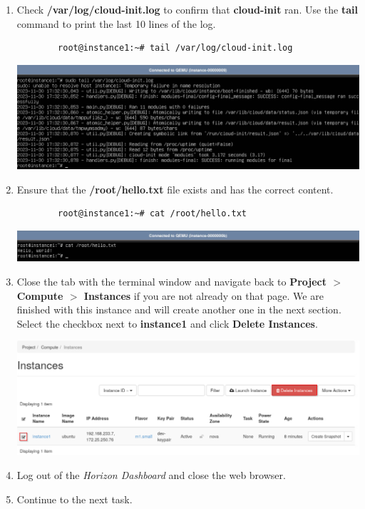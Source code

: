 \documentclass[letterpaper, 12pt]{article}
\begin{document}
\begin{enumerate}
    \item Check \textbf{/var/log/cloud-init.log} to confirm that \textbf{cloud-init} ran. Use the \textbf{tail}
    command to print the last 10 lines of the log.
    \begin{lstlisting}
        root@instance1:~# tail /var/log/cloud-init.log
    \end{lstlisting}

    \begin{center}
        \includegraphics[width=\linewidth]{images/part2/step14.png}
    \end{center}

    \item Ensure that the \textbf{/root/hello.txt} file exists and has the correct content.
    \begin{lstlisting}
        root@instance1:~# cat /root/hello.txt
    \end{lstlisting}

    \begin{center}
        \includegraphics[width=\linewidth]{images/part2/step15.png}
    \end{center}

    \item Close the tab with the terminal window and navigate back to \textbf{Project $>$ Compute $>$ Instances} if you
    are not already on that page. We are finished with this instance and will create another one in the next section.
    Select the checkbox next to \textbf{instance1} and click \textbf{Delete Instances}.

    \begin{center}
        \includegraphics[width=\linewidth]{images/part2/step16.png}
    \end{center}

    \item Log out of the \textit{Horizon Dashboard} and close the web browser.

    \item Continue to the next task.

\end{enumerate}
\end{document}
